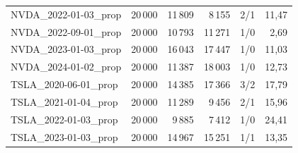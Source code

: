\begin{longtable}{lrrrrr}
NVDA\_2022-01-03\_prop & 20\,000 & 11\,809 & 8\,155 & 2/1 & 11,47 \\
NVDA\_2022-09-01\_prop & 20\,000 & 10\,793 & 11\,271 & 1/0 & 2,69 \\
NVDA\_2023-01-03\_prop & 20\,000 & 16\,043 & 17\,447 & 1/0 & 11,03 \\
NVDA\_2024-01-02\_prop & 20\,000 & 11\,387 & 18\,003 & 1/0 & 12,73 \\
TSLA\_2020-06-01\_prop & 20\,000 & 14\,385 & 17\,366 & 3/2 & 17,79 \\
TSLA\_2021-01-04\_prop & 20\,000 & 11\,289 & 9\,456 & 2/1 & 15,96 \\
TSLA\_2022-01-03\_prop & 20\,000 & 9\,885 & 7\,412 & 1/0 & 24,41 \\
TSLA\_2023-01-03\_prop & 20\,000 & 14\,967 & 15\,251 & 1/1 & 13,35 \\
\bottomrule\end{longtable}\normalsize

